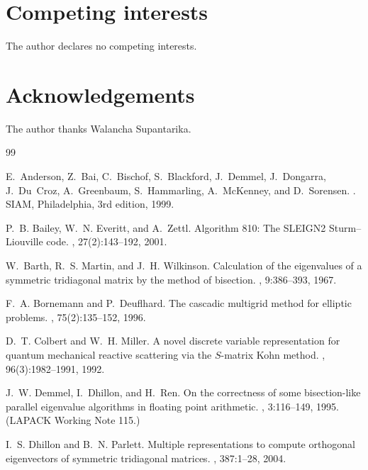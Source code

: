 \documentclass[twocolumn,10pt,a4paper]{article}
\theoremstyle{plain}
\theoremstyle{definition}
\begin{document}
\section*{Competing interests}
The author declares no competing interests.

\section*{Acknowledgements}
The author thanks Walancha Supantarika.

\begin{thebibliography}{99}

E.~Anderson, Z.~Bai, C.~Bischof, S.~Blackford, J.~Demmel, J.~Dongarra,
J.~Du~Croz, A.~Greenbaum, S.~Hammarling, A.~McKenney, and D.~Sorensen.
.
\newblock SIAM, Philadelphia, 3rd edition, 1999.

P.~B. Bailey, W.~N. Everitt, and A.~Zettl.
\newblock Algorithm 810: The SLEIGN2 Sturm--Liouville code.
, 27(2):143--192, 2001.

W.~Barth, R.~S. Martin, and J.~H. Wilkinson.
\newblock Calculation of the eigenvalues of a symmetric tridiagonal matrix by
the method of bisection.
, 9:386--393, 1967.

F.~A. Bornemann and P.~Deuflhard.
\newblock The cascadic multigrid method for elliptic problems.
, 75(2):135--152, 1996.

D.~T. Colbert and W.~H. Miller.
\newblock A novel discrete variable representation for quantum mechanical
reactive scattering via the $S$-matrix Kohn method.
, 96(3):1982--1991, 1992.

J.~W. Demmel, I.~Dhillon, and H.~Ren.
\newblock On the correctness of some bisection-like parallel eigenvalue
algorithms in floating point arithmetic.
, 3:116--149, 1995.
\newblock (LAPACK Working Note 115.)

I.~S. Dhillon and B.~N. Parlett.
\newblock Multiple representations to compute orthogonal eigenvectors of
symmetric tridiagonal matrices.
, 387:1--28, 2004.


\end{thebibliography}
\end{document}
